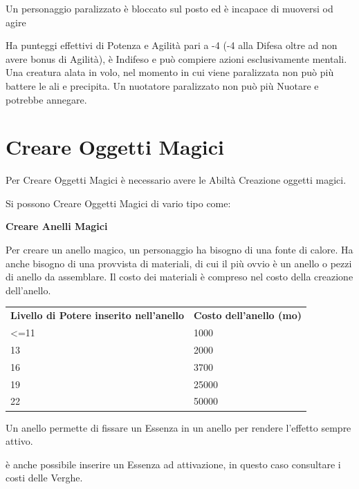 \documentclass[a4paper,11pt,twoside,openany]{book}
\begin{document}
\label{paralizzato}

Un personaggio paralizzato è bloccato sul posto ed è incapace di muoversi od agire

Ha punteggi effettivi di Potenza e Agilità pari a -4 (-4 alla Difesa oltre ad non avere bonus di Agilità), è Indifeso e può compiere azioni esclusivamente mentali. Una creatura alata in volo, nel momento in cui viene paralizzata non può più battere le ali e precipita. Un nuotatore paralizzato non può più Nuotare e potrebbe annegare.

\pagebreak

\section{Creare Oggetti Magici}

\label{creare-oggetti-magici}

Per Creare Oggetti Magici è necessario avere le Abiltà Creazione oggetti magici.

Si possono Creare Oggetti Magici di vario tipo come:

\bigskip

\textbf{Creare Anelli Magici}

Per creare un anello magico, un personaggio ha bisogno di una fonte di calore. Ha anche bisogno di una provvista di materiali, di cui il più ovvio è un anello o pezzi di anello da assemblare. Il costo dei materiali è compreso nel costo della creazione dell'anello.

\bigskip

\begin{tabular}{ll}
	\toprule
	\textbf{Livello di Potere inserito nell'anello} & \textbf{Costo dell'anello (mo)}\\
	\textless=11    & 1000\\
	13              & 2000\\
	16              & 3700\\
	19              & 25000\\
	22              & 50000\\
\end{tabular}

\bigskip

Un anello permette di fissare un Essenza in un anello per rendere l'effetto sempre attivo.

è anche possibile inserire un Essenza ad attivazione, in questo caso consultare i costi delle Verghe.
\end{document}
